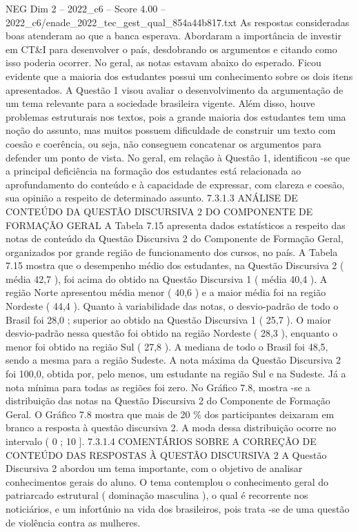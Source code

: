 \begin{textsample}{NEG Dim 2 – 2022\_c6 – Score 4.00 – 2022\_c6/enade\_2022\_tec\_gest\_qual\_854a44b817.txt}
As respostas consideradas boas atenderam ao que a banca esperava.
Abordaram a importância de investir em CT\&I para desenvolver o país, desdobrando os argumentos e citando como isso poderia ocorrer.
No geral, as notas estavam abaixo do esperado.
Ficou evidente que a maioria dos estudantes possui um conhecimento sobre os dois itens apresentados.
A Questão 1 visou avaliar o desenvolvimento da argumentação de um tema relevante para a sociedade brasileira vigente.
Além disso, houve problemas estruturais nos textos, pois a grande maioria dos estudantes tem uma noção do assunto, mas muitos possuem dificuldade de construir um texto com coesão e coerência, ou seja, não conseguem concatenar os argumentos para defender um ponto de vista.
No geral, em relação à Questão 1, identificou -se que a principal deficiência na formação dos estudantes está relacionada ao aprofundamento do conteúdo e à capacidade de expressar, com clareza e coesão, sua opinião a respeito de determinado assunto. 7.3.1.3 ANÁLISE DE CONTEÚDO DA QUESTÃO DISCURSIVA 2 DO COMPONENTE DE FORMAÇÃO GERAL A Tabela 7.15 apresenta dados estatísticos a respeito das notas de conteúdo da Questão Discursiva 2 do Componente de Formação Geral, organizados por grande região de funcionamento dos cursos, no país.
A Tabela 7.15 mostra que o desempenho médio dos estudantes, na Questão Discursiva 2 ( média 42,7 ), foi acima do obtido na Questão Discursiva 1 ( média 40,4 ).
A região Norte apresentou média menor ( 40,6 ) e a maior média foi na região Nordeste ( 44,4 ).
Quanto à variabilidade das notas, o desvio-padrão de todo o Brasil foi 28,0 ; superior ao obtido na Questão Discursiva 1 ( 25,7 ).
O maior desvio-padrão nessa questão foi obtido na região Nordeste ( 28,3 ), enquanto o menor foi obtido na região Sul ( 27,8 ).
A mediana de todo o Brasil foi 48,5, sendo a mesma para a região Sudeste.
A nota máxima da Questão Discursiva 2 foi 100,0, obtida por, pelo menos, um estudante na região Sul e na Sudeste.
Já a nota mínima para todas as regiões foi zero.
No Gráfico 7.8, mostra -se a distribuição das notas na Questão Discursiva 2 do Componente de Formação Geral.
O Gráfico 7.8 mostra que mais de 20 \% dos participantes deixaram em branco a resposta à questão discursiva 2.
A moda dessa distribuição ocorre no intervalo ( 0 ; 10 ]. 7.3.1.4 COMENTÁRIOS SOBRE A CORREÇÃO DE CONTEÚDO DAS RESPOSTAS À QUESTÃO DISCURSIVA 2 A Questão Discursiva 2 abordou um tema importante, com o objetivo de analisar conhecimentos gerais do aluno.
O tema contemplou o conhecimento geral do patriarcado estrutural ( dominação masculina ), o qual é recorrente nos noticiários, e um infortúnio na vida dos brasileiros, pois trata -se de uma questão de violência contra as mulheres.

\end{textsample}

